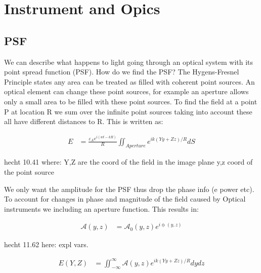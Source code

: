 
\chapter{Instrument and Opics} %
\label{ch:vapp} %


\section{PSF}

We can describe what happens to light going through an optical system with its point spread function (PSF). How do we find the PSF? The Hygens-Fresnel Principle states any area can be treated as filled with coherent point sources. An optical element can change these point sources, for example an aperture allows only a small area to be filled with these point sources. To find the field at a point P at location R we sum over the infinite point sources taking into account these all have different distances to R. This is written as:

\begin{subequations}
    \begin{align}
        E &= \frac{\varepsilon_A e^{i(wt-kR)}}{R} \iint_{Aperture} e^{ik(Yy+Zz)/R} dS
    \end{align}
\end{subequations}

hecht 10.41
where: Y,Z are the coord of the field in the image plane
y,z coord of the point source

We only want the amplitude for the PSF thus drop the phase info (e power etc). To account for changes in phase and magnitude of the field caused by Optical instruments we including an aperture function. This results in:

\begin{subequations}
  \begin{align}
    \mathscr{A}(y,z) &= \mathscr{A}_0 (y,z)e^{i\upphi(y,z)}
  \end{align}
\end{subequations}

hecht 11.62
here: expl vars.  

\begin{subequations}
  \begin{align}
    E(Y,Z) &= \iint_{-\infty}^{\infty} \mathscr{A}(y,z) e^{ik(Yy+Zz)/R} dydz
  \end{align}
\end{subequations}

